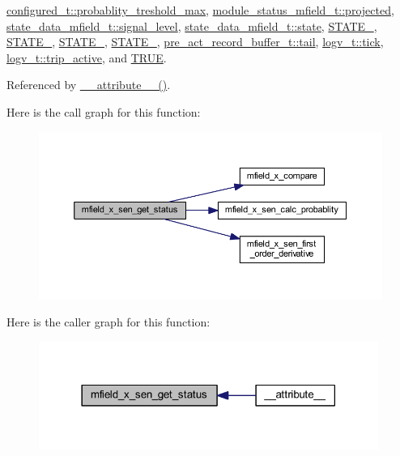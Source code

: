 \hyperlink{a00021_source_l00202}{configured\+\_\+t\+::probablity\+\_\+treshold\+\_\+max}, \hyperlink{a00019_af2267fb093fb5dcaa006a570a6da3b6b}{module\+\_\+status\+\_\+mfield\+\_\+t\+::projected}, \hyperlink{a00019_source_l00101}{state\+\_\+data\+\_\+mfield\+\_\+t\+::signal\+\_\+level}, \hyperlink{a00019_source_l00103}{state\+\_\+data\+\_\+mfield\+\_\+t\+::state}, \hyperlink{a00021_source_l00149}{S\+T\+A\+T\+E\+\_}, \hyperlink{a00021_source_l00150}{S\+T\+A\+T\+E\+\_}, \hyperlink{a00021_source_l00151}{S\+T\+A\+T\+E\+\_}, \hyperlink{a00021_source_l00152}{S\+T\+A\+T\+E\+\_}, \hyperlink{a00022_source_l00144}{pre\+\_\+act\+\_\+record\+\_\+buffer\+\_\+t\+::tail}, \hyperlink{a00021_source_l00247}{logv\+\_\+t\+::tick}, \hyperlink{a00021_source_l00248}{logv\+\_\+t\+::trip\+\_\+active}, and \hyperlink{a00040_source_l00084}{T\+R\+U\+E}.



Referenced by \hyperlink{a00041_source_l00025}{\+\_\+\+\_\+attribute\+\_\+\+\_\+()}.



Here is the call graph for this function\+:\nopagebreak
\begin{figure}[H]
\begin{center}
\leavevmode
\includegraphics[width=350pt]{d1/d84/a00052_a3a46d0e69b27b3566e6d8465cf7a8b0a_cgraph}
\end{center}
\end{figure}




Here is the caller graph for this function\+:\nopagebreak
\begin{figure}[H]
\begin{center}
\leavevmode
\includegraphics[width=314pt]{d1/d84/a00052_a3a46d0e69b27b3566e6d8465cf7a8b0a_icgraph}
\end{center}
\end{figure}



